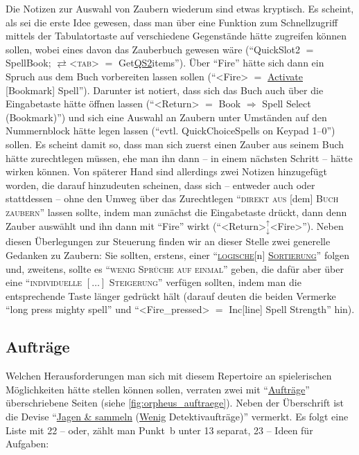 \documentclass[a5paper,pagesize,numbers=noenddot]{scrbook}
\begin{document}
Die Notizen zur Auswahl von Zaubern wiederum sind etwas kryptisch.
Es scheint, als sei die erste Idee gewesen, dass man über eine Funktion zum Schnellzugriff mittels der Tabulatortaste auf verschiedene Gegenstände hätte zugreifen können sollen, wobei eines davon das Zauberbuch gewesen wäre (\enquote{QuickSlot2 $=$ SpellBook; $\rightleftarrows$<\textsc{tab}> $=$ Get\uline{QS2}items}).
Über \enquote{Fire} hätte sich dann ein Spruch aus dem Buch vorbereiten lassen sollen (\enquote{<Fire> $=$ \uline{Activate} [Bookmark] Spell}).
Darunter ist notiert, dass sich das Buch auch über die Eingabetaste hätte öffnen lassen (\enquote{<Return> $=$ Book $\Rightarrow$ Spell Select (Bookmark)}) und sich eine Auswahl an Zaubern unter Umständen auf den Nummernblock hätte legen lassen (\enquote{evtl. QuickChoiceSpells on Keypad 1--0}) sollen.
Es scheint damit so, dass man sich zuerst einen Zauber aus seinem Buch hätte zurechtlegen müssen, ehe man ihn dann -- in einem nächsten Schritt -- hätte wirken können.
Von späterer Hand sind allerdings zwei Notizen hinzugefügt worden, die darauf hinzudeuten scheinen, dass sich -- entweder auch oder stattdessen -- ohne den Umweg über das Zurechtlegen \enquote{\textsc{direkt aus} [dem] \textsc{Buch zaubern}} lassen sollte, indem man zunächst die Eingabetaste drückt, dann denn Zauber auswählt und ihn dann mit \enquote{Fire} wirkt (\enquote{<Return>$_{\downarrow}^{\uparrow}$<Fire>}).
Neben diesen Überlegungen zur Steuerung finden wir an dieser Stelle zwei generelle Gedanken zu Zaubern:
Sie sollten, erstens, einer \enquote{\textsc{\uline{logische}}[n] \textsc{\uline{Sortierung}}} folgen und, zweitens, sollte es \enquote{\textsc{wenig Sprüche auf einmal}} geben, die dafür aber über eine \enquote{\textsc{individuelle $[\dots]$ Steigerung}} verfügen sollten, indem man die entsprechende Taste länger gedrückt hält (darauf deuten die beiden Vermerke \enquote{long press mighty spell} und \enquote{<Fire\_pressed> $=$ Inc[line] Spell Strength} hin).\autocite[S.~3]{orpheus_interface}


\subsection{Aufträge}\label{sec:orpheus_mechanik_auftraege}
Welchen Herausforderungen man sich mit diesem Repertoire an spielerischen Möglichkeiten hätte stellen können sollen, verraten zwei mit \enquote{\uline{Aufträ\-ge}} überschriebene Seiten (siehe \autoref{fig:orpheus_auftraege}).\autocite[Vgl.][S.~16--17]{orpheus_b_scribbles}
Neben der Überschrift ist die Devise \enquote{\uline{Jagen \& sammeln} (\uline{Wenig} Detektivaufträge)} vermerkt.
Es folgt eine Liste mit 22 -- oder, zählt man Punkt~b unter 13 separat, 23 -- Ideen für Aufgaben:
\end{document}
